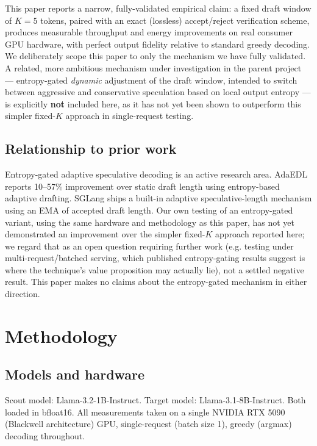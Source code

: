 \documentclass[conference]{IEEEtran}
\begin{document}
This paper reports a narrow, fully-validated empirical claim: a fixed draft
window of $K{=}5$ tokens, paired with an exact (lossless) accept/reject
verification scheme, produces measurable throughput and energy improvements
on real consumer GPU hardware, with perfect output fidelity relative to
standard greedy decoding. We deliberately scope this paper to only the
mechanism we have fully validated. A related, more ambitious mechanism
under investigation in the parent project --- entropy-gated \emph{dynamic}
adjustment of the draft window, intended to switch between aggressive and
conservative speculation based on local output entropy --- is explicitly
\textbf{not} included here, as it has not yet been shown to outperform this
simpler fixed-$K$ approach in single-request testing.

\subsection{Relationship to prior work}

Entropy-gated adaptive speculative decoding is an active research area.
AdaEDL~\cite{adaedl2024} reports 10--57\% improvement over static draft
length using entropy-based adaptive drafting. SGLang ships a built-in
adaptive speculative-length mechanism using an EMA of accepted draft length.
Our own testing of an entropy-gated variant, using the same hardware and
methodology as this paper, has not yet demonstrated an improvement over the
simpler fixed-$K$ approach reported here; we regard that as an open question
requiring further work (e.g. testing under multi-request/batched serving,
which published entropy-gating results suggest is where the technique's
value proposition may actually lie), not a settled negative result. This
paper makes no claims about the entropy-gated mechanism in either direction.

\section{Methodology}

\subsection{Models and hardware}

Scout model: Llama-3.2-1B-Instruct. Target model: Llama-3.1-8B-Instruct.
Both loaded in bfloat16. All measurements taken on a single NVIDIA RTX 5090
(Blackwell architecture) GPU, single-request (batch size 1), greedy
(argmax) decoding throughout.
\end{document}
